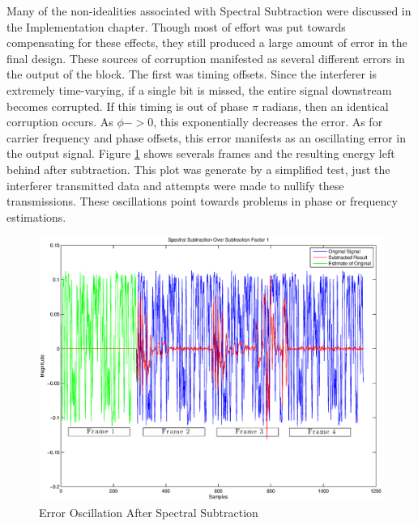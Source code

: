 Many of the non-idealities associated with Spectral Subtraction were discussed in the Implementation chapter.  Though most of effort was put towards compensating for these effects, they still produced a large amount of error in the final design.  These sources of corruption manifested as several different errors in the output of the block.  The first was timing offsets.  Since the interferer is extremely time-varying, if a single bit is missed, the entire signal downstream becomes corrupted.  If this timing is out of phase \(\pi\) radians, then an identical corruption occurs.  As \(\phi->0\), this exponentially decreases the error.  As for carrier frequency and phase offsets, this error manifests as an oscillating error in the output signal.  Figure \ref{ss_oscillation} shows severals frames and the resulting energy left behind after subtraction.  This plot was generate by a simplified test, just the interferer transmitted data and attempts were made to nullify these transmissions.  These oscillations point towards problems in phase or frequency estimations.\\

\begin{figure}\label{ss_oscillation}
\centering
\includegraphics[scale=0.5]{ss_oscillation.eps}
\caption{Error Oscillation After Spectral Subtraction}
\end{figure}


